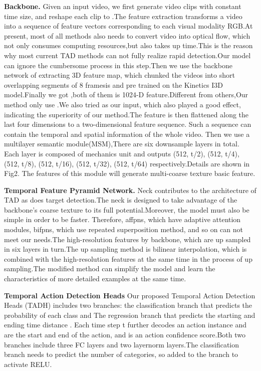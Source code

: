 \documentclass[10pt,twocolumn,letterpaper]{article}
\begin{document}
\textbf{Backbone.} Given an input video, we first generate video clips with constant time size, and reshape each clip to .The feature extraction  transforms a video into a sequence of feature vectors corresponding to each visual modality RGB.At present, most of all methods also needs to convert video into optical flow, which not only consumes computing resources,but also takes up time.This is the reason why most current TAD methods can not fully realize rapid detection.Our model can ignore the cumbersome process in this step.Then we use the backbone network of extracting 3D feature map, which  chunked the videos into short overlapping segments of
8 framesis and pre trained on the Kinetics I3D model.Finally we got ,both of them is 1024-D feature.Different from others,Our method only use  .We also tried  as our input, which also played a good effect, indicating the superiority of our method.The feature is then flattened along the last four dimensions to a two-dimensional feature sequence. Such a sequence can contain the temporal and spatial information of the whole video. Then we use a multilayer semantic module(MSM),There are six downsample layers in total. Each layer is composed of mechanics unit and outputs (512, t/2), (512, t/4), (512, t/8), (512, t/16), (512, t/32), (512, t/64) respectively.Details are shown in Fig2. The features of this module will generate multi-coarse texture basic feature.

\textbf{Temporal Feature Pyramid Network.} 
Neck contributes to the architecture of TAD as does target detection.The neck is designed to take advantage of the backbone's coarse texture to its full potential.Moreover, the model must also be simple in order to be faster.
Therefore, affpns, which have adaptive attention modules, bifpns, which use repeated superposition method, and so on can not meet our needs.The high-resolution features by backbone, which are up sampled in six layers in turn.The up sampling method is bilinear interpolation, which is combined with the high-resolution features at the same time in the process of up sampling.The modified method can simplify the model and learn the characteristics of more detailed examples at the same time.

\textbf{Temporal Action Detection Heads} 
Our proposed Temporal Action Detection Heads (TADH) includes two branches: the classification branch that predicts the probability of each class  and The regression branch that predicts the starting and ending time distance . Each time step t further decodes an action instance
 and  are the start and end of the action, and  is an action confidence score.Both two branches include three FC layers and two layernorm layers.The classification branch needs to predict the number of categories, so added to the branch to activate RELU.
\end{document}
